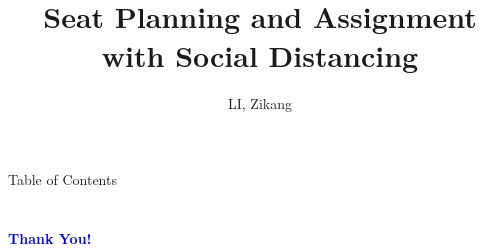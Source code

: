 \documentclass[aspectratio=43]{beamer}
\title{Seat Planning and Assignment with Social Distancing} %
\author[LI]{LI, Zikang}
\institute[HKUST]{
    IEDA%
    \\%
    The Hong Kong University of Science and Technology%
} %
\begin{document}
    \frame{\titlepage}

    \begin{frame}{Table of Contents}
        \tableofcontents
    \end{frame}
    
    
    
    
    
    
    
    
    
    

    \section{}
    \begin{frame}{}
        \centering
            \Huge\bfseries
        \textcolor{blue}{Thank You!}
    \end{frame}
\end{document}
